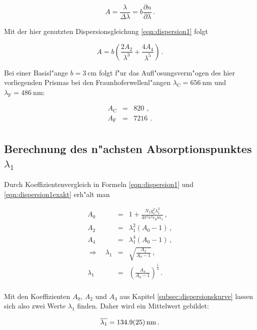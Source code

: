 		\begin{equation*}
			A = \frac{\lambda}{\Delta \lambda} = b \frac{\partial n}{\partial \lambda} \,.
		\end{equation*}

		Mit der hier genutzten Dispersionsgleichung \eqref{eqn:dispersion1} folgt

		\begin{equation*}
			A = b \left( \frac{2A_2}{\lambda^3} + \frac{4A_4}{\lambda^5} \right) \,.
		\end{equation*}

		Bei einer Basisl"ange $b = \SI{3}{\centi \meter}$ folgt f"ur das Aufl"osungsverm"ogen des hier vorliegenden Prismas bei den Fraunhoferwellenl"angen $\lambda_\mathrm{C} = \SI{656}{\nano \meter}$ und $\lambda_\mathrm{F} = \SI{486}{\nano \meter}$:

		\begin{eqnarray*}
			A_\mathrm{C} & = & \SI{820}{} \,, \\
			A_\mathrm{F} & = & \SI{7216}{} \,. \\
		\end{eqnarray*}

		\clearpage

	\subsection{Berechnung des n"achsten Absorptionspunktes $\lambda_\mathrm{1}$}
	\label{subsec:absorptionspunkt}
		Durch Koeffizientenvergleich in Formeln \eqref{eqn:dispersion1} und \eqref{eqn:dispersion1exakt} erh"alt man

		\begin{eqnarray*}
			A_0 & = & 1 + \frac{N_1 q_1^2 \lambda_1^2}{4 \pi^2 c^2 \epsilon_0 m_1} \,, \\
			A_2 & = & \lambda_1^2 (A_0 - 1) \,, \\
			A_4 & = & \lambda_1^4 (A_0 - 1) \,, \\
			\Rightarrow \quad \lambda_1 & = & \sqrt{\frac{A_2}{A_0 - 1}} \,, \\
			\lambda_1 & = & \left(\frac{A_4}{A_0 - 1}\right)^\frac{1}{4} \,. \\
		\end{eqnarray*}

		Mit den Koeffizienten $A_0$, $A_2$ und $A_4$ aus Kapitel \ref{subsec:dispersionskurve} lassen sich also zwei Werte $\lambda_1$ finden.
		Daher wird ein Mittelwert gebildet:

		\begin{equation*}
			\overline{\lambda_1} = \SI{134.9 (25)}{\nano \meter} \,.
		\end{equation*}

